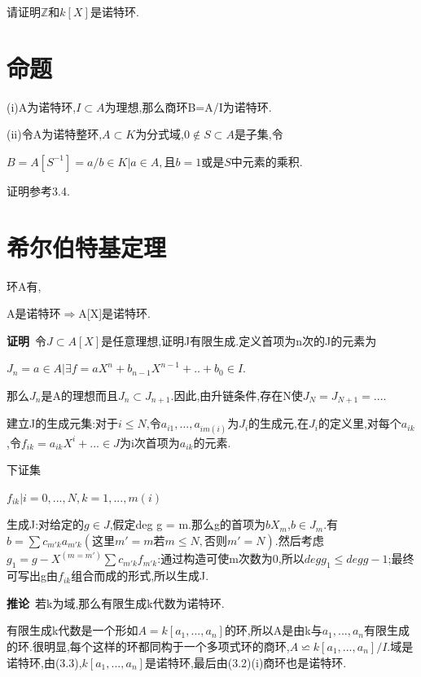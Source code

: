 \documentclass[UTF8]{book}
\begin{document}
		
		请证明$\mathbb{Z}$和$ k[X] $是诺特环.
		
	\section{命题}
		(i)A为诺特环,$I \subset A$为理想,那么商环B=A/I为诺特环.
		
		
		(ii)令A为诺特整环,$A \subset K$为分式域,$0 \notin S \subset A$是子集,令
		
		
		\begin{center}
			$B=A[S^{-1}]={a/b \in K|a \in A,且b=1或是S中元素的乘积}$.
		\end{center}
		
		
		证明参考3.4.
		
		
	\section{希尔伯特基定理}
		环A有,
		
		
		\begin{center}
			A是诺特环$\Rightarrow$A[X]是诺特环.
		\end{center}
		
		
		\textbf{证明}\ 令$J \subset A[X]$是任意理想,证明J有限生成.定义首项为n次的J的元素为
		
		
		\begin{center}
			$J_{n}={a\in A|\exists f=aX^{n}+b_{n-1}X^{n-1}+..+b_{0}\in I}$.
		\end{center}
		
		
		那么$J_{n}$是A的理想而且$J_{n} \subset J_{n+1}$.因此,由升链条件,存在N使$J_{N}=J_{N+1}=...$.
		
		
		建立J的生成元集:对于$i \leqslant N$,令$a_{i1},...,a_{im(i)}$为$J_{i}$的生成元,在$J_{i}$的定义里,对每个$a_{ik}$,令$f_{ik}=a_{ik}X^{i}+...\in J$为i次首项为$a_{ik}$的元素.
		
		
		下证集
		
		
		\begin{center}
			${f_{ik}|i=0,...,N,k=1,...,m(i)}$
		\end{center}
		
		
		生成J:对给定的$g\in J$,假定deg g = m.那么g的首项为$bX_{m}$,$b\in J_{m}$.有$b=\sum c_{m'k}a_{m'k}(这里m'=m若m\leqslant N,否则m'=N)$.然后考虑$g_{1}=g-X^{(m=m')} \sum c_{m'k}f_{m'k}$:通过构造可使m次数为0,所以$deg g_{1} \leqslant deg g-1$;最终可写出g由$f_{ik}$组合而成的形式,所以生成J.
		
		
		\textbf{推论}\ 若k为域,那么有限生成k代数为诺特环.
		
		
		有限生成k代数是一个形如$A=k[a_{1},...,a_{n}]$的环,所以A是由k与$a_{1},...,a_{n}$有限生成的环.很明显,每个这样的环都同构于一个多项式环的商环,$A \backsimeq k[a_{1},...,a_{n}]/I$.域是诺特环,由(3.3),$k[a_{1},...,a_{n}]$是诺特环,最后由(3.2)(i)商环也是诺特环.
		
\end{document}
